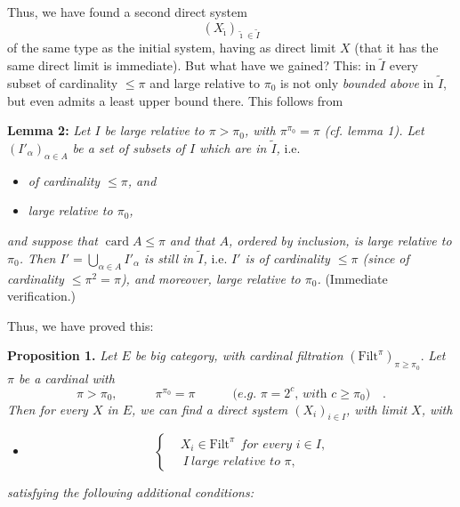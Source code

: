 \documentclass[11pt]{article}
\newcommand{\msp}[1]{\marginpar{\footnotesize [#1]}}
\newcommand{\card}{\operatorname{card}}
\newcommand{\Filt}{\mathrm{Filt}}
\begin{document}
Thus, we have found a second direct system
\[
(X_{\tilde\imath})_{\tilde\imath\in\tilde I}
\]
of the same type as the initial system, having as direct limit $X$ (that it has the same direct limit is immediate). But what have we gained? This: in $\tilde I$ every subset of cardinality $\le\pi$ and large relative to $\pi_0$ is not only \textit{bounded above} in $\tilde I$, but even admits a least upper bound there. This follows from %

\msp{page 83}
\textbf{Lemma 2:} \textit{Let $I$ be large relative to $\pi>\pi_0$, with $\pi^{\pi_0}=\pi$} \textit{(cf. lemma 1). Let $(I'_\alpha)_{\alpha\in A}$ be a set of subsets of $I$ which are in $\tilde I$,} i.e.

\begin{itemize}
\item[a)] \textit{of cardinality $\le\pi$, and}
\item[b)] \textit{large relative to $\pi_0$,}
\end{itemize}

\textit{and suppose that} $\card A\le\pi$ \textit{and that $A$, ordered by inclusion, is large relative to $\pi_0$. Then $I'=\bigcup_{\alpha\in A} I'_\alpha$ is still in $\tilde I$,} i.e. \textit{$I'$ is of cardinality $\le\pi$ (since of cardinality $\le\pi^2=\pi$), and moreover, large relative to $\pi_0$.} (Immediate verification.)

Thus, we have proved this:

\textbf{Proposition 1.} \textit{Let $E$ be} \textit{big category, with cardinal filtration} $(\Filt^\pi)_{\pi\ge\pi_0}$. \textit{Let $\pi$ be a cardinal with}
\[
\pi>\pi_0, \qquad\quad \pi^{\pi_0}=\pi \qquad\quad \textit{(e.g. $\pi=2^c$, with $c\ge\pi_0$)} \quad .
\]
\textit{Then for every $X$ in $E$, we can find a direct system $(X_i)_{i\in I}$, with limit $X$, with}

\begin{itemize}
\item[a)] \[ \left\{ \begin{aligned} & X_i\in\Filt^\pi \ \ \textit{for every $i\in I$,} \\ & \ I \ \textit{large relative to $\pi$,} \end{aligned} \right. \]
\end{itemize}

\textit{satisfying the following additional conditions:}
\end{document}
